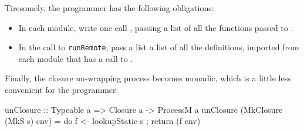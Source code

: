 \documentclass[preprint]{sigplanconf}
\begin{document}
Tiresomely, the programmer has the following obligations:
\begin{itemize}
\item In each module, write one call ,
passing a list of all the functions passed to .
\item In the call to \texttt{runRemote}, pass a list
a list of all the  definitions, imported from
each module that has a call to .
\end{itemize}

Finally, the closure un-wrapping process becomes monadic, which is
a little less convenient for the programmer:
\begin{code}
  unClosure :: Typeable a => Closure a -> ProcessM a
  unClosure (MkClosure (MkS s) env)
    = do { f <- lookupStatic s
         ; return (f env) }
\end{code}
\end{document}
